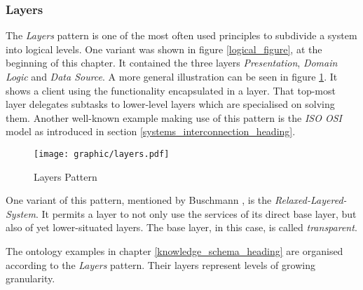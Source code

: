 %
%
%
%
%
%
%

\subsubsection{Layers}
\label{layers_heading}

The \emph{Layers} pattern \cite{buschmann} is one of the most often used
principles to subdivide a system into logical levels. One variant was shown in
figure \ref{logical_figure}, at the beginning of this chapter. It contained the
three layers \emph{Presentation}, \emph{Domain Logic} and \emph{Data Source}. A
more general illustration can be seen in figure \ref{layers_figure}. It shows a
client using the functionality encapsulated in a layer. That top-most layer
delegates subtasks to lower-level layers which are specialised on solving them.
Another well-known example making use of this pattern is the \emph{ISO OSI}
model as introduced in section \ref{systems_interconnection_heading}.

\begin{figure}[ht]
    \begin{center}
        \texttt{[image: graphic/layers.pdf]}
        \caption{Layers Pattern}
        \label{layers_figure}
    \end{center}
\end{figure}

One variant of this pattern, mentioned by Buschmann \cite{buschmann}, is the
\emph{Relaxed-Layered-System}. It permits a layer to not only use the services
of its direct base layer, but also of yet lower-situated layers. The base layer,
in this case, is called \emph{transparent}.

The ontology examples in chapter \ref{knowledge_schema_heading} are organised
according to the \emph{Layers} pattern. Their layers represent levels of
growing granularity.
